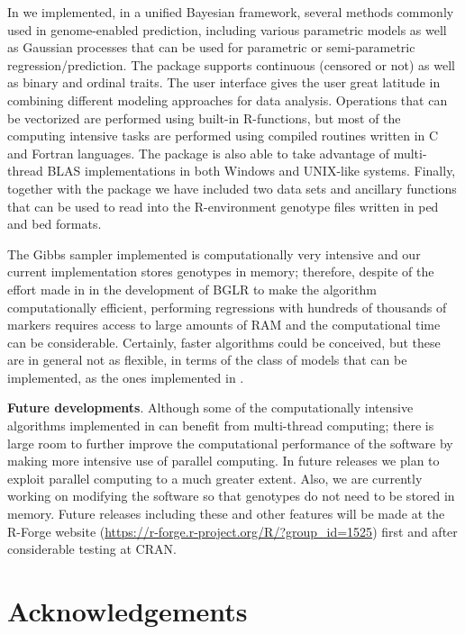 \documentclass[article,shortnames,nojss]{jss}
\begin{document}
In  we implemented, in a unified Bayesian framework, several methods 
commonly used in genome-enabled prediction, including various 
parametric models as well as Gaussian processes that can be 
used for parametric or semi-parametric regression/prediction.  
The package supports continuous (censored or not) as well as 
binary and ordinal traits. The user interface gives the user great latitude in 
combining different modeling approaches for data analysis. 
Operations that can be vectorized are performed using built-in 
R-functions, but most of the computing intensive tasks 
are performed using compiled routines written in C and 
Fortran languages. The package is also able to take advantage 
of multi-thread BLAS implementations in both Windows and UNIX-like 
systems.  Finally, together with the package we have included 
two data sets and ancillary functions that can be used to 
read into the R-environment genotype files written in ped and bed formats.

The Gibbs sampler implemented is 
computationally very intensive and our current implementation 
stores genotypes in memory; therefore, despite of the effort 
made in in the development of BGLR to make the algorithm computationally 
efficient, performing regressions with hundreds of thousands of 
markers requires access to large amounts of RAM and the computational 
time can be considerable. Certainly, faster 
algorithms could be conceived, but these are in general not as 
flexible, in terms of the class of models that 
can be implemented, as the ones implemented in .

\textbf{Future developments}. Although some of the computationally 
intensive algorithms implemented in  can benefit from 
multi-thread computing; there is large room to further 
improve the computational performance of the software 
by making more intensive use of parallel computing. In future 
releases we plan to exploit parallel computing to a much 
greater extent. Also, we are currently working on modifying 
the software so that genotypes do not need to be stored 
in memory. Future releases including these and other 
features will be made at the R-Forge website 
(\url{https://r-forge.r-project.org/R/?group_id=1525}) 
first and after considerable testing at CRAN.

\section*{Acknowledgements} 
\end{document}
